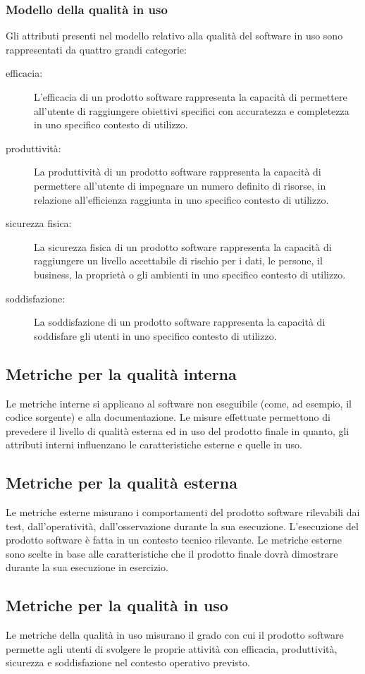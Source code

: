 \documentclass[../PianoDiQualifica.tex]{subfiles}
\begin{document}
\begin{appendices}
		\subsubsection{Modello della qualità in uso}
		Gli attributi presenti nel modello relativo alla qualità del software in uso sono rappresentati da quattro grandi categorie:
		\begin{description}
			\item[efficacia:] L'efficacia di un prodotto software rappresenta la capacità di permettere all'utente di raggiungere obiettivi specifici con accuratezza e completezza in uno specifico contesto di utilizzo.
			\item[produttività:] La produttività di un prodotto software rappresenta la capacità di permettere all'utente di impegnare un numero definito di risorse, in relazione all’efficienza raggiunta in uno specifico contesto di utilizzo.
			\item[sicurezza fisica:] La sicurezza fisica di un prodotto software rappresenta la capacità di raggiungere un livello accettabile di rischio per i dati, le persone, il business, la proprietà o gli ambienti in uno specifico contesto di utilizzo.
			\item[soddisfazione:] La soddisfazione di un prodotto software rappresenta la capacità di soddisfare gli utenti in uno specifico contesto di utilizzo.
		\end{description}
	
	\subsection{Metriche per la qualità interna}
	Le metriche interne si applicano al software non eseguibile (come, ad esempio, il codice sorgente) e alla documentazione. Le misure effettuate permettono di prevedere il livello di qualità esterna ed in uso del prodotto finale in quanto, gli attributi interni influenzano le caratteristiche esterne e quelle in uso.
	
	\subsection{Metriche per la qualità esterna}
	Le metriche esterne misurano i comportamenti del prodotto software rilevabili dai test, dall'operatività, dall'osservazione durante la sua esecuzione. L'esecuzione del prodotto software è fatta in un contesto tecnico rilevante.
	Le metriche esterne sono scelte in base alle caratteristiche che il prodotto finale dovrà dimostrare durante la sua esecuzione in esercizio.
	
	\subsection{Metriche per la qualità in uso}
	Le metriche della qualità in uso misurano il grado con cui il prodotto software permette agli utenti di svolgere le proprie attività con efficacia, produttività, sicurezza e soddisfazione nel contesto operativo previsto.
	
\end{appendices}
\end{document}
